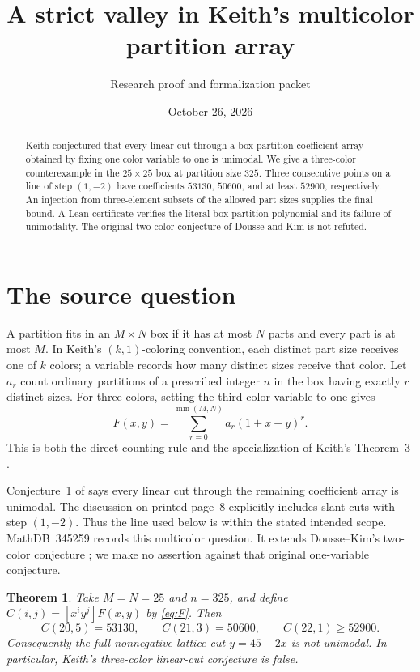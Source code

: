 \documentclass[11pt]{article}
\title{A strict valley in Keith's multicolor partition array}
\author{Research proof and formalization packet}
\date{October 26, 2026}
\newtheorem{theorem}{Theorem}
\begin{document}
\maketitle
\begin{abstract}
Keith conjectured that every linear cut through a box-partition coefficient
array obtained by fixing one color variable to one is unimodal. We give a
three-color counterexample in the $25\times25$ box at partition size $325$.
Three consecutive points on a line of step $(1,-2)$ have coefficients
$53130$, $50600$, and at least $52900$, respectively. An injection from
three-element subsets of the allowed part sizes supplies the final bound.
A Lean certificate verifies the literal box-partition polynomial and its
failure of unimodality. The original two-color conjecture of Dousse and Kim
is not refuted.
\end{abstract}

\section{The source question}
A partition fits in an $M\times N$ box if it has at most $N$ parts and
every part is at most $M$. In Keith's $(k,1)$-coloring convention, each
distinct part size receives one of $k$ colors; a variable records how many
distinct sizes receive that color. Let $a_r$ count ordinary partitions of
a prescribed integer $n$ in the box having exactly $r$ distinct sizes.
For three colors, setting the third color variable to one gives
\begin{equation}\label{eq:F}
 F(x,y)=\sum_{r=0}^{\min(M,N)}a_r(1+x+y)^r.
\end{equation}
This is both the direct counting rule and the specialization of
Keith's Theorem~3 \cite{Keith}.

Conjecture~1 of \cite{Keith} says every linear cut through the remaining
coefficient array is unimodal. The discussion on printed page~8 explicitly
includes slant cuts with step $(1,-2)$. Thus the line used below is within
the stated intended scope. MathDB~345259 records this multicolor question.
It extends Dousse--Kim's two-color conjecture \cite[Conjecture~7.1(ii)]{DK};
we make no assertion against that original one-variable conjecture.

\begin{theorem}\label{thm:main}
Take $M=N=25$ and $n=325$, and define $C(i,j)=[x^iy^j]F(x,y)$ by
\eqref{eq:F}. Then
\[
 C(20,5)=53130,\qquad C(21,3)=50600,\qquad C(22,1)\ge52900.
\]
Consequently the full nonnegative-lattice cut $y=45-2x$ is not unimodal.
In particular, Keith's three-color linear-cut conjecture is false.
\end{theorem}
\end{document}
